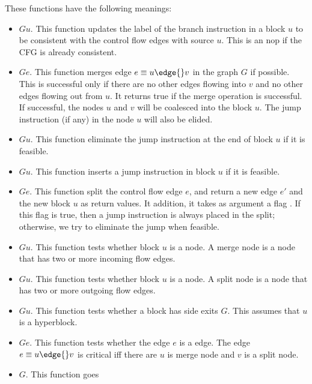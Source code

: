 These functions have the following meanings:
\begin{itemize}
  \item  {} $G u$.  This function
     updates the label of the branch instruction in a block $u$
     to be consistent with the control flow edges with source $u$.  
     This is an nop if the CFG is already consistent. 
  \item {} $G e$. This function merges edge 
        $e \equiv u \edge{} v$
        in the graph $G$ if possible.   This is successful only if
        there are no other edges flowing into $v$ and no other edges
        flowing out from $u$.  It returns true if the merge
        operation is successful.  If successful, the nodes $u$ and $v$
        will be coalesced into the block $u$.   The jump instruction (if any)
        in the node $u$ will also be elided.
  \item {} $G u$.  This function eliminate the
      jump instruction at the end of block $u$ if it is feasible.
  \item {} $G u$.  This function inserts a jump
       instruction in block $u$ if it is feasible.
  \item {} $G e$.  This function 
     split the control flow edge $e$, and return a new edge $e'$ and the 
     new block $u$ as return values.  It addition, it takes as
     argument a flag .  If this flag is true, 
     then a jump instruction is always placed in the 
     split; otherwise, we try to eliminate the jump when feasible.
  \item {} $G u$.  This function tests whether block $u$
          is a  node.  A merge node is a node that
          has two or more incoming flow edges.
  \item {} $G u$.  This function tests whether block $u$
           is a  node.  A split node is a node that
            has two or more outgoing flow edges.
  \item {} $G u$.  This function tests whether
           a block has side exits $G$.  This assumes that $u$
           is a hyperblock.
  \item {} $G e$.  This function tests whether
      the edge $e$ is a  edge.  The 
       edge $e \equiv u \edge{} v$ is critical iff 
      there are $u$ is merge node and $v$ is a split node.
  \item  {} $G$.  This function goes

\end{itemize}
